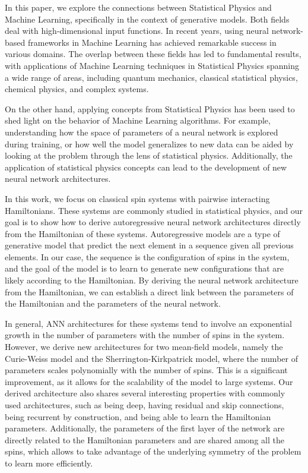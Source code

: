 \documentclass[aps,physrev,10pt,floatfix,longbibliography,nofootinbib,reprint]{revtex4-2}
\begin{document}
      In this paper, we explore the connections between Statistical Physics and Machine Learning, specifically in the context of generative models. Both fields deal with high-dimensional input functions. In recent years, using neural network-based frameworks in Machine Learning has achieved remarkable success in various domains. The overlap between these fields has led to fundamental results, with applications of Machine Learning techniques in Statistical Physics spanning a wide range of areas, including quantum mechanics, classical statistical physics, chemical physics, and complex systems.

      On the other hand, applying concepts from Statistical Physics has been used to shed light on the behavior of Machine Learning algorithms. For example, understanding how the space of parameters of a neural network is explored during training, or how well the model generalizes to new data can be aided by looking at the problem through the lens of statistical physics. Additionally, the application of statistical physics concepts can lead to the development of new neural network architectures.
      
      In this work, we focus on classical spin systems with pairwise interacting Hamiltonians. These systems are commonly studied in statistical physics, and our goal is to show how to derive autoregressive neural network architectures directly from the Hamiltonian of these systems. Autoregressive models are a type of generative model that predict the next element in a sequence given all previous elements. In our case, the sequence is the configuration of spins in the system, and the goal of the model is to learn to generate new configurations that are likely according to the Hamiltonian. By deriving the neural network architecture from the Hamiltonian, we can establish a direct link between the parameters of the Hamiltonian and the parameters of the neural network.
      
      In general, ANN architectures for these systems tend to involve an exponential growth in the number of parameters with the number of spins in the system. However, we derive new architectures for two mean-field models, namely the Curie-Weiss model and the Sherrington-Kirkpatrick model, where the number of parameters scales polynomially with the number of spins. This is a significant improvement, as it allows for the scalability of the model to large systems. Our derived architecture also shares several interesting properties with commonly used architectures, such as being deep, having residual and skip connections, being recurrent by construction, and being able to learn the Hamiltonian parameters. Additionally, the parameters of the first layer of the network are directly related to the Hamiltonian parameters and are shared among all the spins, which allows to take advantage of the underlying symmetry of the problem to learn more efficiently.
            
\end{document}

